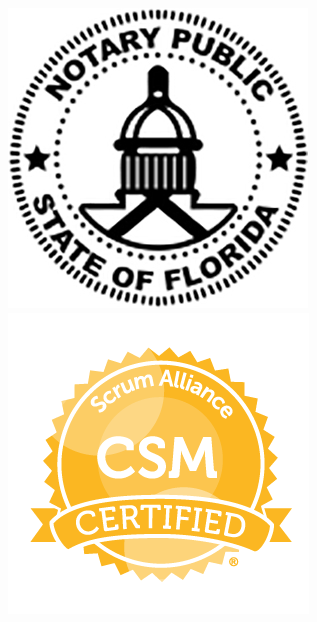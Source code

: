 \documentclass[letterpaper,]{article}
\begin{document}
\begin{center}
    \href{https://notaries.dos.state.fl.us/notidsearch.asp?id=1682252}{\includegraphics[scale=0.2]{florida-notary-public-seal.jpg}}
    \href{https://bcert.me/bc/html/profile.jsp?k=gberipx}{\includegraphics[scale=0.23]{CSM Badge.png}}
    
\end{center}

\end{document}
